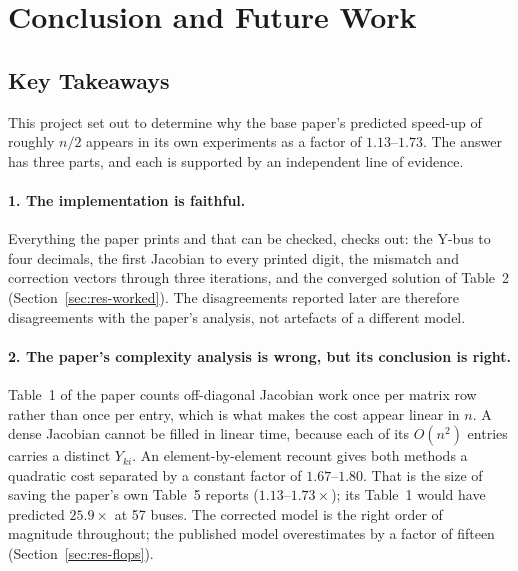 \documentclass[sigconf,nonacm]{acmart}
\begin{document}
\section{Conclusion and Future Work}

\subsection{Key Takeaways}
This project set out to determine why the base paper's predicted speed-up of
roughly $n/2$ appears in its own experiments as a factor of $1.13$--$1.73$. The
answer has three parts, and each is supported by an independent line of
evidence.

\paragraph{1. The implementation is faithful.}
Everything the paper prints and that can be checked, checks out: the Y-bus to
four decimals, the first Jacobian to every printed digit, the mismatch and
correction vectors through three iterations, and the converged solution of
Table~2 (Section~\ref{sec:res-worked}). The disagreements reported later are
therefore disagreements with the paper's analysis, not artefacts of a different
model.

\paragraph{2. The paper's complexity analysis is wrong, but its conclusion is
right.}
Table~1 of the paper counts off-diagonal Jacobian work once per matrix row
rather than once per entry, which is what makes the cost appear linear in $n$. A
dense Jacobian cannot be filled in linear time, because each of its $O(n^2)$
entries carries a distinct $Y_{ki}$. An element-by-element recount gives both
methods a quadratic cost separated by a constant factor of $1.67$--$1.80$. That
is the size of saving the paper's own Table~5 reports ($1.13$--$1.73\times$);
its Table~1 would have predicted $25.9\times$ at 57 buses. The corrected model is
the right order of magnitude throughout; the published model overestimates by a
factor of fifteen (Section~\ref{sec:res-flops}).
\end{document}
